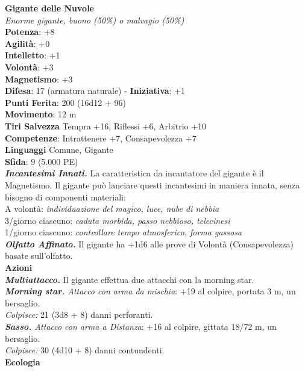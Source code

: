 \begin{multicols}{2}
\medskip\textbf{Gigante delle Nuvole}\\
\emph{Enorme gigante, buono (50\%) o malvagio (50\%)}\\
\textbf{Potenza}: +8 \\
\textbf{Agilità}: +0\\
\textbf{Intelletto}: +1\\
\textbf{Volontà}: +3\\
\textbf{Magnetismo}: +3\\
\textbf{Difesa}: 17 (armatura naturale) - \textbf{Iniziativa}: +1\\
\textbf{Punti Ferita}: 200 (16d12 + 96)\\
\textbf{Movimento}: 12 m\\
\textbf{Tiri Salvezza} Tempra +16, Riflessi +6, Arbitrio +10\\
\textbf{Competenze}: Intrattenere +7, Consapevolezza +7\\
\textbf{Linguaggi} Comune, Gigante\\
\textbf{Sfida}: 9 (5.000 PE)\smallskip\\
\emph{\textbf{Incantesimi Innati.}} La caratteristica da incantatore del gigante è il Magnetismo. Il gigante può lanciare questi incantesimi in maniera innata, senza bisogno di componenti materiali:\\
A volontà: \emph{individuazione del magico, luce, nube di nebbia}\\
3/giorno ciascuno: \emph{caduta morbida, passo nebbioso, telecinesi}\\
1/giorno ciascuno: \emph{controllare tempo atmosferico, forma gassosa}\\
\emph{\textbf{Olfatto Affinato.}} Il gigante ha +1d6 alle prove di Volontà (Consapevolezza) basate sull'olfatto.\\
\smallskip\textbf{Azioni}\\
\emph{\textbf{Multiattacco.}} Il gigante effettua due attacchi con la morning star.\\
\emph{\textbf{Morning star.} Attacco con arma da mischia}: +19 al colpire, portata 3 m, un bersaglio.\\
\emph{Colpisce:} 21 (3d8 + 8) danni perforanti.\\
\emph{\textbf{Sasso.} Attacco con arma a Distanza}: +16 al colpire, gittata 18/72 m, un bersaglio.\\
\emph{Colpisce:} 30 (4d10 + 8) danni contundenti.\\
\textbf{Ecologia}\\

\end{multicols}
